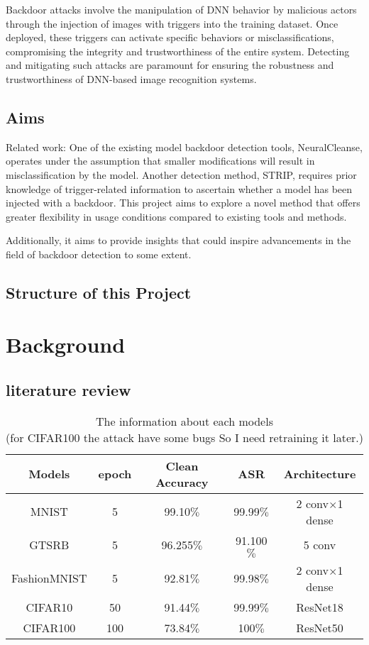 \documentclass[12pt]{report}
\begin{document}
    Backdoor attacks involve the manipulation of DNN behavior by malicious actors through the 
    injection of images with triggers into the training dataset. Once deployed, these triggers 
    can activate specific behaviors or misclassifications, compromising the integrity and 
    trustworthiness of the entire system. Detecting and mitigating such attacks are paramount 
    for ensuring the robustness and trustworthiness of DNN-based image recognition systems.

\section{Aims}
    Related work: One of the existing model backdoor detection tools, NeuralCleanse, operates under 
    the assumption that smaller modifications will result in misclassification by the model. Another 
    detection method, STRIP, requires prior knowledge of trigger-related information to ascertain 
    whether a model has been injected with a backdoor. This project aims to explore a novel method 
    that offers greater flexibility in usage conditions compared to existing tools and methods. 
    
    Additionally, it aims to provide insights that could inspire advancements in the field of 
    backdoor detection to some extent.
\section{Structure of this Project}


\chapter{Background}
\section{literature review}


\begin{table*}[t]
    \centering
    \caption{The information about each models\\(for CIFAR100 the attack have some bugs So I need retraining it later.)}
    \label{table1}
    \begin{tabular}{|c|c|c|c|c|}
        \hline
        Models & epoch & Clean Accuracy & ASR & Architecture \\
        \hline
        MNIST & 5 & 99.10$\%$ & 99.99$\%$ &2 conv$\times$1 dense \\
        \hline
        GTSRB & 5 & 96.255$\%$ & 91.100$\%$ &5 conv \\
        \hline
        FashionMNIST & 5 & 92.81$\%$ & 99.98$\%$ & 2 conv$\times$1 dense \\
        \hline
        CIFAR10 & 50 & 91.44$\%$ & 99.99$\%$ & ResNet18 \\
        \hline
        CIFAR100 & 100 & 73.84$\%$ & 100$\%$ & ResNet50 \\
        \hline
    
        
    \end{tabular}
    
\end{table*}
\end{document}
